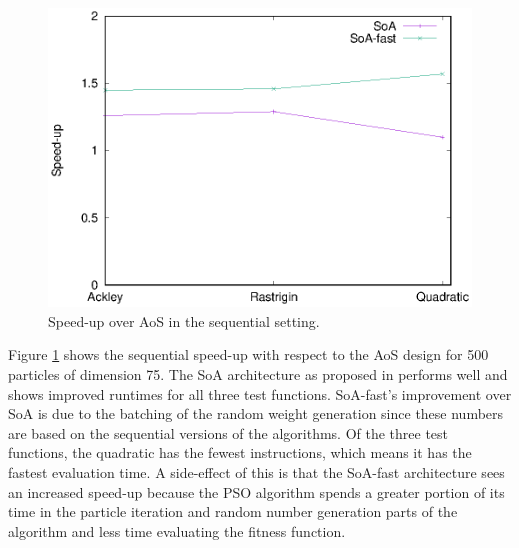 \begin{figure}
  \includegraphics[width=\columnwidth]{../img/output/speedup_seq}
  \caption{Speed-up over AoS in the sequential setting.}\label{fig:seq-baseline}
\end{figure}

% 
% 

Figure \ref{fig:seq-baseline} shows the sequential speed-up with respect to the
AoS design for 500 particles of dimension 75. The SoA architecture as proposed
in \cite{cache-pso} performs well and shows improved runtimes for all three test
functions. SoA-fast's improvement over SoA is due to the
batching of the random weight generation since these numbers are based on the
sequential versions of the algorithms. Of the three test functions, the
quadratic has the fewest instructions, which means it has the fastest evaluation
time. A side-effect of this is that the SoA-fast architecture sees an
increased speed-up because the PSO algorithm spends a greater portion of its
time in the particle iteration and random number generation parts of the
algorithm and less time evaluating the fitness function.



